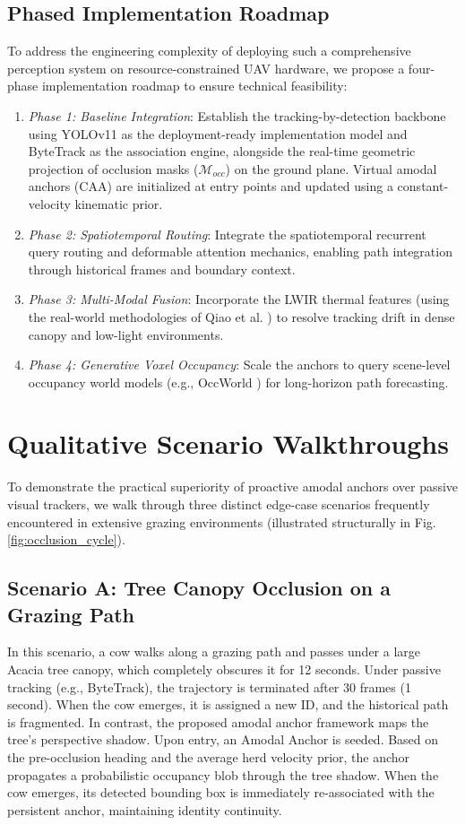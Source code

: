 \documentclass[10pt,conference,letterpaper,twocolumn]{article}
\begin{document}
\subsection{Phased Implementation Roadmap}
To address the engineering complexity of deploying such a comprehensive perception system on resource-constrained UAV hardware, we propose a four-phase implementation roadmap to ensure technical feasibility:
\begin{enumerate}
    \item \textit{Phase 1: Baseline Integration}: Establish the tracking-by-detection backbone using YOLOv11 as the deployment-ready implementation model and ByteTrack \cite{zhang2022bytetrack} as the association engine, alongside the real-time geometric projection of occlusion masks ($\mathcal{M}_{occ}$) on the ground plane. Virtual amodal anchors (CAA) are initialized at entry points and updated using a constant-velocity kinematic prior.
    \item \textit{Phase 2: Spatiotemporal Routing}: Integrate the spatiotemporal recurrent query routing and deformable attention mechanics, enabling path integration through historical frames and boundary context.
    \item \textit{Phase 3: Multi-Modal Fusion}: Incorporate the LWIR thermal features (using the real-world methodologies of Qiao et al. \cite{qiao2023cattle}) to resolve tracking drift in dense canopy and low-light environments.
    \item \textit{Phase 4: Generative Voxel Occupancy}: Scale the anchors to query scene-level occupancy world models (e.g., OccWorld \cite{zheng2024occworld}) for long-horizon path forecasting.
\end{enumerate}

\section{Qualitative Scenario Walkthroughs}
To demonstrate the practical superiority of proactive amodal anchors over passive visual trackers, we walk through three distinct edge-case scenarios frequently encountered in extensive grazing environments (illustrated structurally in Fig. \ref{fig:occlusion_cycle}).

\subsection{Scenario A: Tree Canopy Occlusion on a Grazing Path}
In this scenario, a cow walks along a grazing path and passes under a large Acacia tree canopy, which completely obscures it for 12 seconds. Under passive tracking (e.g., ByteTrack), the trajectory is terminated after 30 frames (1 second). When the cow emerges, it is assigned a new ID, and the historical path is fragmented. In contrast, the proposed amodal anchor framework maps the tree's perspective shadow. Upon entry, an Amodal Anchor is seeded. Based on the pre-occlusion heading and the average herd velocity prior, the anchor propagates a probabilistic occupancy blob through the tree shadow. When the cow emerges, its detected bounding box is immediately re-associated with the persistent anchor, maintaining identity continuity.
\end{document}
